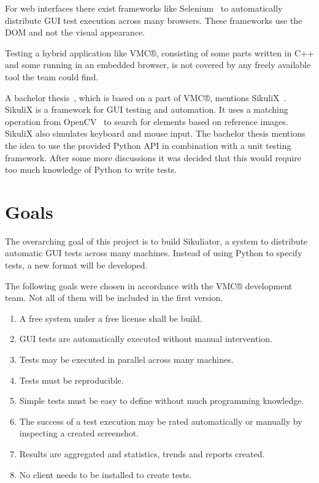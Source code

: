 \documentclass[a4paper,twocolumn,twoside]{article}
\newcommand{\VMC}[0]{VMC®}
\newcommand{\Sik}[0]{Sikuliator}
\begin{document}
For web interfaces there exist frameworks like Selenium~\cite{Selenium} to automatically distribute GUI test execution across many browsers.
These frameworks use the DOM and not the visual appearance.

Testing a hybrid application like \VMC{}, consisting of some parts written in C++ and some running in an embedded browser, is not covered by any freely available tool the team could find.

A bachelor thesis~\cite{BachelorMapViewer}, which is based on a part of \VMC{}, mentions SikuliX~\cite{SikuliX}.
SikuliX is a framework for GUI testing and automation.
It uses a matching operation from OpenCV~\cite{OpenCV} to search for elements based on reference images.
SikuliX also simulates keyboard and mouse input.
The bachelor thesis mentions the idea to use the provided Python API in combination with a unit testing framework.
After some more discussions it was decided that this would require too much knowledge of Python to write tests.

\section{Goals}
The overarching goal of this project is to build \Sik{}, a system to distribute automatic GUI tests across many machines.
Instead of using Python to specify tests, a new format will be developed.


The following goals were chosen in accordance with the \VMC{} development team.
Not all of them will be included in the first version.
\begin{enumerate}
	\item A free system under a free license shall be build.
	\item GUI tests are automatically executed without manual intervention.
	\item Tests may be executed in parallel across many machines.
	\item Tests must be reproducible.
	\item Simple tests must be easy to define without much programming knowledge.
	\item The success of a test execution may be rated automatically or manually by inspecting a created screenshot.
	\item Results are aggregated and statistics, trends and reports created.
	\item No client needs to be installed to create tests.
\end{enumerate}
\end{document}
